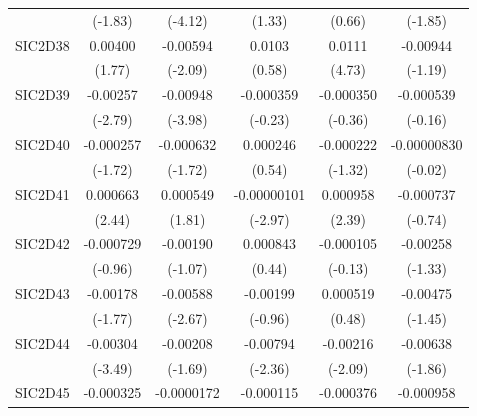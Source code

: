 \begin{table}[htbp]
\begin{tabular}{l*{5}{c}}
            &     (-1.83)         &     (-4.12)         &      (1.33)         &      (0.66)         &     (-1.85)         \\
SIC2D38     &     0.00400         &    -0.00594\sym{*}  &      0.0103         &      0.0111\sym{***}&    -0.00944         \\
            &      (1.77)         &     (-2.09)         &      (0.58)         &      (4.73)         &     (-1.19)         \\
SIC2D39     &    -0.00257\sym{**} &    -0.00948\sym{***}&   -0.000359         &   -0.000350         &   -0.000539         \\
            &     (-2.79)         &     (-3.98)         &     (-0.23)         &     (-0.36)         &     (-0.16)         \\
SIC2D40     &   -0.000257         &   -0.000632         &    0.000246         &   -0.000222         & -0.00000830         \\
            &     (-1.72)         &     (-1.72)         &      (0.54)         &     (-1.32)         &     (-0.02)         \\
SIC2D41     &    0.000663\sym{*}  &    0.000549         & -0.00000101\sym{**} &    0.000958\sym{*}  &   -0.000737         \\
            &      (2.44)         &      (1.81)         &     (-2.97)         &      (2.39)         &     (-0.74)         \\
SIC2D42     &   -0.000729         &    -0.00190         &    0.000843         &   -0.000105         &    -0.00258         \\
            &     (-0.96)         &     (-1.07)         &      (0.44)         &     (-0.13)         &     (-1.33)         \\
SIC2D43     &    -0.00178         &    -0.00588\sym{**} &    -0.00199         &    0.000519         &    -0.00475         \\
            &     (-1.77)         &     (-2.67)         &     (-0.96)         &      (0.48)         &     (-1.45)         \\
SIC2D44     &    -0.00304\sym{***}&    -0.00208         &    -0.00794\sym{*}  &    -0.00216\sym{*}  &    -0.00638         \\
            &     (-3.49)         &     (-1.69)         &     (-2.36)         &     (-2.09)         &     (-1.86)         \\
SIC2D45     &   -0.000325         &  -0.0000172         &   -0.000115         &   -0.000376         &   -0.000958         \\

\end{tabular}
\end{table}

